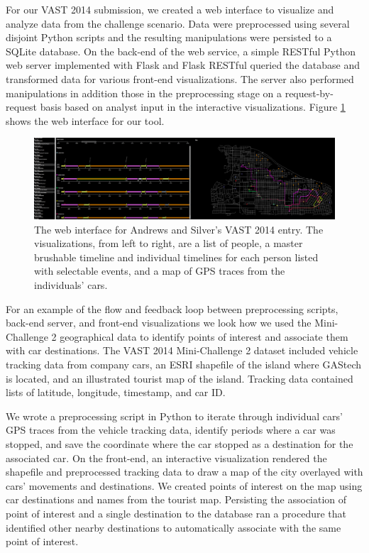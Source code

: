 \documentclass[midd]{thesis}
\begin{document}
For our VAST 2014 submission, we created a web interface to visualize and
analyze data from the challenge scenario. Data were preprocessed using several
disjoint Python scripts and the resulting manipulations were persisted to a
SQLite database. On the back-end of the web service, a simple RESTful Python web
server implemented with Flask \cite{flask} and Flask RESTful
\cite{flask-restful} queried the database and transformed data for various
front-end visualizations. The server also performed manipulations in addition
those in the preprocessing stage on a request-by-request basis based on analyst
input in the interactive visualizations. Figure \ref{fig:vast2014} shows the web
interface for our tool.

\begin{figure}[!ht]
  \centering
  \includegraphics[width=1\textwidth]{vast-mc2-2014-cropped-scaled}
  \caption[Web interface for the VAST 2014 entry.]{The web interface for Andrews
  and Silver's VAST 2014 entry. The visualizations, from left to right, are a
  list of people, a master brushable timeline and individual timelines for each
  person listed with selectable events, and a map of GPS traces from the
  individuals' cars.}
  \label{fig:vast2014}
\end{figure}

For an example of the flow and feedback loop between preprocessing scripts,
back-end server, and front-end visualizations we look how we used the
Mini-Challenge 2 geographical data to identify points of interest and associate
them with car destinations. The VAST 2014 Mini-Challenge 2 dataset included
vehicle tracking data from company cars, an ESRI shapefile of the island where
GAStech is located, and an illustrated tourist map of the island. Tracking data
contained lists of latitude, longitude, timestamp, and car ID.

We wrote a preprocessing script in Python to iterate through individual
cars' GPS traces from the vehicle tracking data, identify periods where a car
was stopped, and save the coordinate where the car stopped as a destination for
the associated car. On the front-end, an interactive visualization rendered the
shapefile and preprocessed tracking data to draw a map of the city overlayed
with cars' movements and destinations. We created points of interest on the map
using car destinations and names from the tourist map. Persisting the
association of point of interest and a single destination to the database ran a
procedure that identified other nearby destinations to automatically associate
with the same point of interest.
\end{document}
